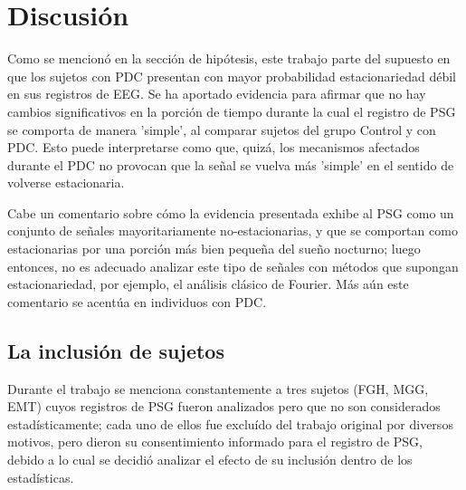 \documentclass[12pt,a4paper]{mitthesis}
\begin{document}

\section{Discusi\'on}

Como se mencion\'o en la secci\'on de hip\'otesis, este trabajo parte del supuesto en que los
sujetos con PDC presentan con mayor probabilidad estacionariedad d\'ebil en sus registros de EEG.
Se ha aportado evidencia para afirmar que no hay cambios significativos en la porci\'on de tiempo 
durante la cual el registro de PSG se comporta de manera 'simple', al comparar sujetos del grupo Control y con
PDC. Esto puede interpretarse como que, quiz\'a, los mecanismos afectados durante el PDC no 
provocan que la se\~nal se vuelva m\'as 'simple' en el sentido de volverse estacionaria.

Cabe un comentario sobre c\'omo la evidencia presentada exhibe al PSG como un conjunto de se\~nales 
mayoritariamente no-estacionarias, y que se comportan como estacionarias por una porci\'on m\'as
bien peque\~na del sue\~no nocturno; luego entonces, no es adecuado analizar este tipo de se\~nales 
con m\'etodos que supongan estacionariedad, por ejemplo, el an\'alisis cl\'asico de Fourier. 
M\'as a\'un este comentario se acent\'ua en individuos con PDC.


\subsection{La inclusi\'on de sujetos}

Durante el trabajo se menciona constantemente a tres sujetos (FGH, MGG, EMT) cuyos registros de PSG 
fueron analizados pero que no son considerados estad\'isticamente; cada uno de ellos fue exclu\'ido 
del trabajo original \cite{VazquezTagle16} por diversos motivos, pero dieron su consentimiento 
informado para el registro de PSG, debido a lo cual se decidi\'o analizar el efecto de su 
inclusi\'on dentro de los estad\'isticas.
\end{document}

